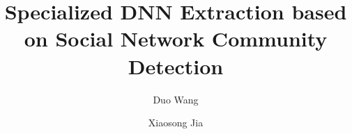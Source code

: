 \documentclass{acmtog} %
\begin{document}
\title{Specialized DNN Extraction based on Social Network Community Detection} %

\author{
Duo Wang
\and
Xiaosong Jia
}


\maketitle
\end{document}
